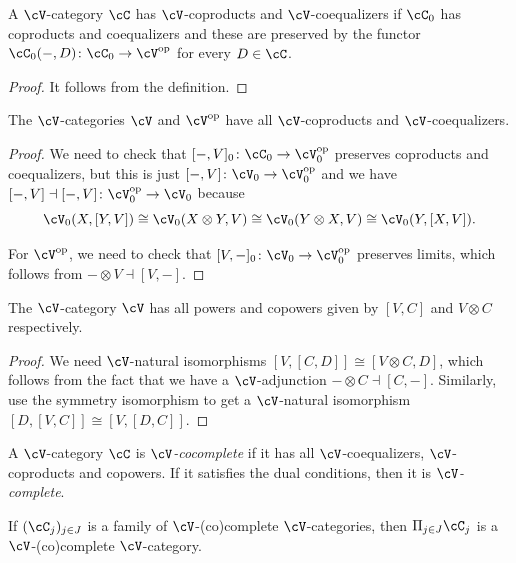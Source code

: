 \documentclass[a4paper,11pt,oneside,openany]{scrbook}
\begin{document}
\begin{prop}
	A $\cV$-category $\cC$ has $\cV$-coproducts and $\cV$-coequalizers if $\cC_0$ has coproducts and coequalizers and these are preserved by the functor $\cC_0(-,D)\colon\cC_0\rightarrow\cV^{\op}$ for every $D\in\cC$.
\end{prop}

\begin{proof}
	It follows from the definition.
\end{proof}

\begin{cor}
	The $\cV$-categories $\cV$ and $\cV^{\op}$ have all $\cV$-coproducts and $\cV$-coequalizers.
\end{cor}

\begin{proof}
	We need to check that $[-,V]_0\colon\cC_0\rightarrow\cV_0^{\op}$ preserves
    coproducts and coequalizers, but this is just
    $[-,V]\colon\cV_0\rightarrow\cV_0^{\op}$ and we have
    $[-,V]\dashv[-,V]\colon\cV_0^{\op}\rightarrow\cV_0$ because
	$$\cV_0(X,[Y,V])\cong\cV_0(X\otimes Y,V)\cong\cV_0(Y\otimes
    X,V)\cong\cV_0(Y,[X,V]).$$

	For $\cV^{\op}$, we need to check that $[V,-]_0\colon\cV_0\rightarrow\cV_0^{\op}$ preserves limits, which follows from $-\otimes V\dashv [V,-]$.
\end{proof}

\begin{prop}
	The $\cV$-category $\cV$ has all powers and copowers given by $[V,C]$ and $V\otimes C$ respectively.
\end{prop}

\begin{proof}
	We need $\cV$-natural isomorphisms $[V,[C,D]]\cong[V\otimes C,D]$, which follows from the fact that we have a $\cV$-adjunction $-\otimes C\dashv [C,-]$. Similarly, use the symmetry isomorphism to get a $\cV$-natural isomorphism $[D,[V,C]]\cong[V,[D,C]]$.
\end{proof}

\begin{defn}
	A $\cV$-category $\cC$ is \emph{$\cV$-cocomplete} if it has all $\cV$-coequalizers, $\cV$-coproducts and copowers. If it satisfies the dual conditions, then it is \emph{$\cV$-complete}.
\end{defn}

\begin{exmp}
	If $(\cC_j)_{j\in J}$ is a family of $\cV$-(co)complete $\cV$-categories, then $\Pi_{j\in J}\cC_j$ is a $\cV$-(co)complete $\cV$-category.
\end{exmp}
\end{document}
